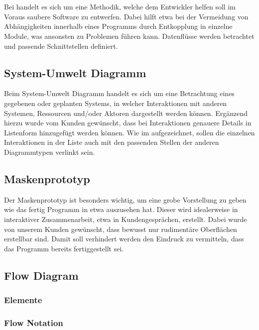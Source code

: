 
\section{\textFlowDesign}

Bei \textFlowDesign{} handelt es sich um eine Methodik, welche dem Entwickler helfen soll
im Voraus saubere Software zu entwerfen. Dabei hilft \textFlowDesign{} etwa bei der
Vermeidung von Abhängigkeiten innerhalb eines Programms durch Entkopplung in einzelne
Module, was ansonsten zu Problemen führen kann.
Datenflüsse werden betrachtet und passende Schnittstellen definiert.

\subsection{System-Umwelt Diagramm}
Beim System-Umwelt Diagramm handelt es sich um eine Betrachtung eines gegebenen oder geplanten Systems, in welcher Interaktionen mit anderen Systemen, Ressourcen und/oder Aktoren dargestellt werden können. Ergänzend hierzu wurde vom Kunden gewünscht, dass bei Interaktionen genauere Details in Listenform hinzugefügt werden können.
Wie im  aufgezeichnet, sollen die einzelnen Interaktionen in der Liste auch mit den passenden Stellen der anderen Diagrammtypen verlinkt sein.


\subsection{Maskenprototyp}
Der Maskenprototyp ist besonders wichtig, um eine grobe Vorstellung zu geben wie das fertig Programm in etwa auszusehen hat. Dieser wird idealerweise in interaktiver Zusammenarbeit, etwa in Kundengesprächen, erstellt. Dabei wurde von unserem Kunden gewünscht, dass bewusst nur rudimentäre Oberflächen erstellbar sind. Damit soll verhindert werden den Eindruck zu vermitteln, dass das Programm bereits fertiggestellt sei.

\subsection{Flow Diagram}

\subsubsection{Elemente}

\subsubsection{Flow Notation}
